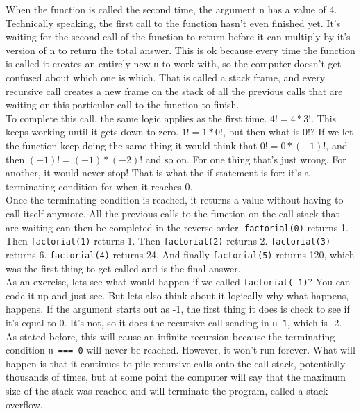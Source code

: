 When the function is called the second time, the argument n has a value of 4. Technically speaking, the first call to the function hasn't even finished yet. It's waiting for the second call of the function to return before it can multiply by it's version of n to return the total answer. This is ok because every time the function is called it creates an entirely new \texttt{n} to work with, so the computer doesn't get confused about which one is which. That is called a stack frame, and every recursive call creates a new frame on the stack of all the previous calls that are waiting on this particular call to the function to finish.\\

To complete this call, the same logic applies as the first time. \(4! = 4 * 3!\). This keeps working until it gets down to zero. \(1! = 1 * 0!\), but then what is \(0!\)? If we let the function keep doing the same thing it would think that \(0! = 0 * (-1)!\), and then \((-1)! = (-1)*(-2)!\)  and so on. For one thing that's just wrong. For another, it would never stop! That is what the if-statement is for: it's a terminating condition for when it reaches 0.\\

Once the terminating condition is reached, it returns a value without having to call itself anymore. All the previous calls to the function on the call stack that are waiting can then be completed in the reverse order. \texttt{factorial(0)} returns 1. Then \texttt{factorial(1)} returns 1. Then \texttt{factorial(2)} returns 2. \texttt{factorial(3)} returns 6. \texttt{factorial(4)} returns 24. And finally \texttt{factorial(5)} returns 120, which was the first thing to get called and is the final answer.\\

As an exercise, lets see what would happen if we called \texttt{factorial(-1)}? You can code it up and just see. But lets also think about it logically why what happens, happens. If the argument starts out as -1, the first thing it does is check to see if it's equal to 0. It's not, so it does the recursive call sending in \texttt{n-1}, which is -2. As stated before, this will cause an infinite recursion because the terminating condition \texttt{n === 0} will never be reached. However, it won't run forever. What will happen is that it continues to pile recursive calls onto the call stack, potentially thousands of times, but at some point the computer will say that the maximum size of the stack was reached and will terminate the program, called a stack overflow.\\

